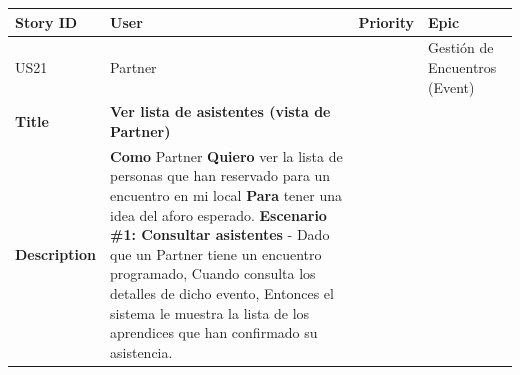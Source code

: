 {\def\LTcaptype{none} %
\begin{longtable}[]{@{}
  >{\raggedright\arraybackslash}p{}
  >{\raggedright\arraybackslash}p{}
  >{\raggedright\arraybackslash}p{}
  >{\raggedright\arraybackslash}p{}@{}}
\toprule\noalign{}
\begin{minipage}[b]{\linewidth}\raggedright
Story ID
\end{minipage} & \begin{minipage}[b]{\linewidth}\raggedright
User
\end{minipage} & \begin{minipage}[b]{\linewidth}\raggedright
Priority
\end{minipage} & \begin{minipage}[b]{\linewidth}\raggedright
Epic
\end{minipage} \\
\midrule\noalign{}
\endhead
\bottomrule\noalign{}
\endlastfoot
US21 & Partner & 3 & Gestión de Encuentros (Event) \\
\textbf{Title} & \textbf{Ver lista de asistentes (vista de Partner)} &
& \\
\textbf{Description} & \textbf{Como} Partner \textbf{Quiero} ver la
lista de personas que han reservado para un encuentro en mi local
\textbf{Para} tener una idea del aforo esperado. \textbf{Escenario \#1:
Consultar asistentes} - Dado que un Partner tiene un encuentro
programado, Cuando consulta los detalles de dicho evento, Entonces el
sistema le muestra la lista de los aprendices que han confirmado su
asistencia. & & \\
\end{longtable}
}

